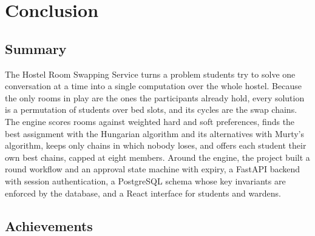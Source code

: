 
\chapter{Conclusion}
\label{ch:conclusion}

\section{Summary}

The Hostel Room Swapping Service turns a problem students try to solve
one conversation at a time into a single computation over the whole
hostel. Because the only rooms in play are the ones the participants
already hold, every solution is a permutation of students over bed
slots, and its cycles are the swap chains. The engine scores rooms
against weighted hard and soft preferences, finds the best assignment
with the Hungarian algorithm and its alternatives with Murty's
algorithm, keeps only chains in which nobody loses, and offers each
student their own best chains, capped at eight members. Around the
engine, the project built a round workflow and an approval state
machine with expiry, a FastAPI backend with session authentication, a
PostgreSQL schema whose key invariants are enforced by the database, and
a React interface for students and wardens.

\section{Achievements}

